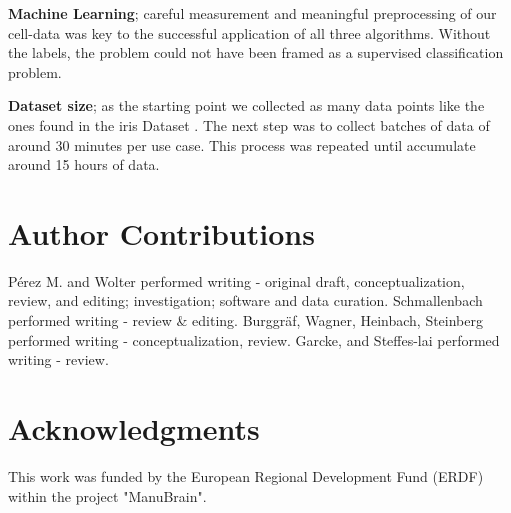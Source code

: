 \documentclass[5p,times,procedia]{elsarticle}
\begin{document}
\textbf{Machine Learning}; careful measurement and  meaningful preprocessing
of our cell-data was key to the successful application of all three algorithms.
Without the labels, the problem could not have been framed as a supervised 
classification problem.

\textbf{Dataset size}; as the starting point we collected as many data points like the ones found in the iris Dataset \cite{fisher_1936}. The next step was to collect batches of data of around 30 minutes per use case. This process was repeated until accumulate around 15 hours of data.

\section{Author Contributions}

Pérez M. and Wolter performed writing - original draft, conceptualization, review, and editing; investigation; software and data curation.
Schmallenbach performed writing - review \& editing.
Burggräf, Wagner, Heinbach, Steinberg performed writing - conceptualization, review.
Garcke, and Steffes-lai performed writing - review.

\section*{Acknowledgments}
This work was funded by the European Regional Development Fund (ERDF) within the project "ManuBrain".


\end{document}
